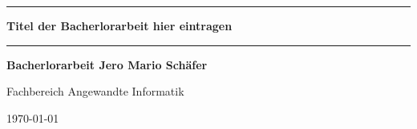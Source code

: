 \newpage
\thispagestyle{empty}
\newcommand{\Rule}{\rule{\textwidth}{1mm}}

\begin{center}

\Rule\vspace{5mm}
\sffamily\bfseries\Huge
Titel der Bacherlorarbeit hier eintragen
\vspace{1mm}\Rule
\vfill
\sffamily\bfseries\LARGE Bacherlorarbeit
\vfill
\sffamily\bfseries\Large Jero Mario Schäfer\par
Fachbereich Angewandte Informatik\par
\vfill

\raisebox{7mm}{Georg-August-Universität}
\raisebox{7mm}{Göttingen}\par
\vfill
\today
\end{center}
\newpage
